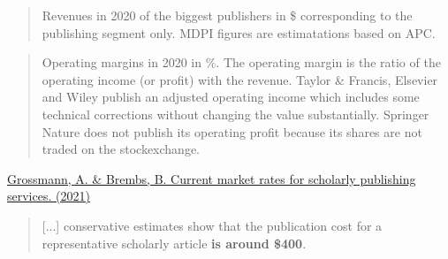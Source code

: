 \documentclass[10pt,compress,serif,aspectratio=169]{beamer}
\begin{document}

\begin{frame}[t]%
 \vskip1cm%
\end{frame}


\begin{frame}[t]%
 \vskip1cm%
 \begin{quote}
   Revenues in 2020 of the biggest publishers in \$ corresponding to the publishing segment only. MDPI figures are estimatations based on APC.
 \end{quote}
\end{frame}


\begin{frame}[t]%
 \vskip1cm%
 \begin{quote}
   \small
Operating margins in 2020 in \%. The operating margin is the ratio of the operating income (or profit) with the revenue. Taylor \& Francis, Elsevier and Wiley publish an adjusted operating income which includes some technical corrections without changing the value substantially. Springer Nature does not publish its operating profit because its shares are not traded on the stockexchange.  
 \end{quote}
\end{frame}

\begin{frame}[t]%
 \vskip1cm%

\href{https://doi.org/10.12688/f1000research.27468.2}{Grossmann, A. \& Brembs, B. Current market rates for scholarly publishing services. (2021)} 
 \begin{quote}
   [...] conservative estimates show that the publication cost for a representative scholarly article \textbf{is around \$400}.
 \end{quote}

 \pause
 \vfill
{}
\end{frame}

\end{document}
